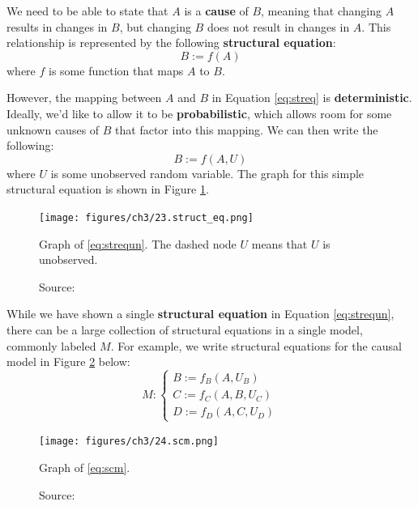 We need to be able to state that $A$ is a \textbf{cause} of $B$,
meaning that changing $A$ results in changes in $B$, but changing
$B$ does not result in changes in $A$.
This relationship is represented by the following
\textbf{structural equation}:
\begin{equation}
B := f(A) \label{eq:streq}
\end{equation}
where \( f \) is some function that maps $A$ to $B$.

However, the mapping between $A$ and $B$ in Equation \ref{eq:streq}
is \textbf{deterministic}. Ideally, we'd like to allow it to be
\textbf{probabilistic}, which allows room for some unknown
causes of $B$ that factor into this mapping.
We can then write the following:
\begin{equation}
B := f(A, U) \label{eq:strequn}
\end{equation}
where \( U \) is some unobserved random variable.
The graph for this simple structural equation is shown in Figure \ref{fig:struct_eq}.

\begin{figure}[H]
    \centering
    \texttt{[image: figures/ch3/23.struct\_eq.png]}
    \caption{Graph of \ref{eq:strequn}.
    The dashed node $U$ means that
    $U$ is unobserved.}
    \vspace{-10px}
    \caption*{\scriptsize{Source: \cite{Neal_2020a}}}
    \label{fig:struct_eq}
\end{figure}

While we have shown a single \textbf{structural equation}
in Equation \ref{eq:strequn}, there can be a large collection of
structural equations in a single model, commonly
labeled \( M \). For example, we write structural equations
for the causal model in Figure \ref{fig:scm} below:
\begin{equation}
M :
\begin{cases}
B := f_B(A, U_B) \\
C := f_C(A, B, U_C) \\
D := f_D(A, C, U_D)
\end{cases}
\label{eq:scm}
\end{equation}

\begin{figure}[H]
    \centering
    \texttt{[image: figures/ch3/24.scm.png]}
    \caption{Graph of \ref{eq:scm}.}
    \vspace{-10px}
    \caption*{\scriptsize{Source: \cite{Neal_2020a}}}
    \label{fig:scm}
\end{figure}

